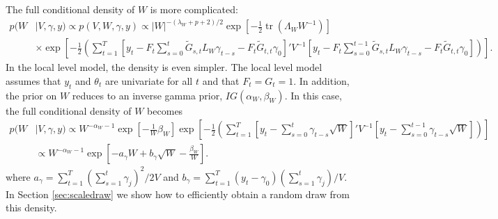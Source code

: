 \documentclass{article}
\DeclareMathOperator{\tr}{tr}
\begin{document}
The full conditional density of $W$ is more complicated:
 \begin{align*}
  p(W&|V,\gamma,y) \propto  p(V,W,\gamma,y) \propto |W|^{-(\lambda_W + p + 2)/2}\exp\left[-\frac{1}{2}\tr\left(\Lambda_WW^{-1}\right)\right]\\
&\times  \exp\left[-\frac{1}{2}\left(\sum_{t=1}^T\left[y_t-F_t\sum_{s=0}^{t}\tilde{G}_{s,t}L_W\gamma_{t-s} - F_t\tilde{G}_{t,t}\gamma_0\right]'V^{-1}\left[y_t-F_t\sum_{s=0}^{t-1}\tilde{G}_{s,t}L_W\gamma_{t-s} - F_t\tilde{G}_{t,t}\gamma_0\right]\right)\right]. 
 \end{align*}
In the local level model, the density is even simpler. The local level model assumes that $y_t$ and $\theta_t$ are univariate for all $t$ and that $F_t=G_t=1$. In addition, the prior on $W$ reduces to an inverse gamma prior, $IG(\alpha_W,\beta_W)$. In this case, the full conditional density of $W$ becomes
\begin{align*}
  p(W&|V,\gamma,y) \propto W^{-\alpha_W   - 1}\exp\left[-\frac{1}{W}\beta_W  \right]  \exp\left[-\frac{1}{2}\left(\sum_{t=1}^T\left[y_t-\sum_{s=0}^{t}\gamma_{t-s}\sqrt{W}\right]'V^{-1}\left[y_t-\sum_{s=0}^{t-1}\gamma_{t-s}\sqrt{W}\right]\right)\right]\\
&\propto W^{-\alpha_W - 1}\exp\left[-a_\gamma W + b_\gamma \sqrt{W} -\frac{\beta_W}{W}\right]. 
\end{align*}
where $a_\gamma =\sum_{t=1}^T(\sum_{s=1}^t\gamma_j)^2/2V$ and $b_\gamma =\sum_{t=1}^T(y_t-\gamma_0)(\sum_{s=1}^t\gamma_j)/V$. In Section \ref{sec:scaledraw} we show how to efficiently obtain a random draw from this density.
\end{document}
